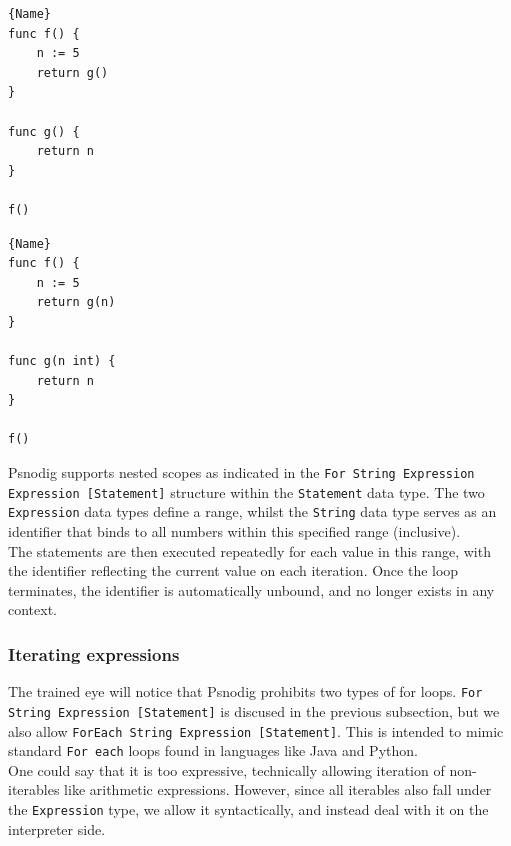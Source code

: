 \begin{minipage}{.45\textwidth}
\begin{lstlisting}[caption=Code with error, captionpos=b, frame=tlrb]{Name}
func f() {
    n := 5
    return g()
}

func g() {
    return n
}

f()
\end{lstlisting}
\end{minipage}\hfill
\begin{minipage}{.45\textwidth}
\begin{lstlisting}[caption=Code without error, captionpos=b, frame=tlrb]{Name}
func f() {
    n := 5
    return g(n)
}

func g(n int) {
    return n
}

f()
\end{lstlisting}
\end{minipage}

Psnodig supports nested scopes as indicated in the \texttt{For String Expression Expression [Statement]} structure within the \texttt{Statement} data type. The two \texttt{Expression} data types define a range, whilst the \texttt{String} data type serves as an identifier that binds to all numbers within this specified range (inclusive). \hfill \\

The statements are then executed repeatedly for each value in this range, with the identifier reflecting the current value on each iteration. Once the loop terminates, the identifier is automatically unbound, and no longer exists in any context.

\subsubsection{Iterating expressions}

The trained eye will notice that Psnodig prohibits two types of for loops. \texttt{For String Expression [Statement]} is discused in the previous subsection, but we also allow \texttt{ForEach String Expression [Statement]}. This is intended to mimic standard \texttt{For each} loops found in languages like Java and Python. \hfill \\

One could say that it is too expressive, technically allowing iteration of non-iterables like arithmetic expressions. However, since all iterables also fall under the \texttt{Expression} type, we allow it syntactically, and instead deal with it on the interpreter side.

